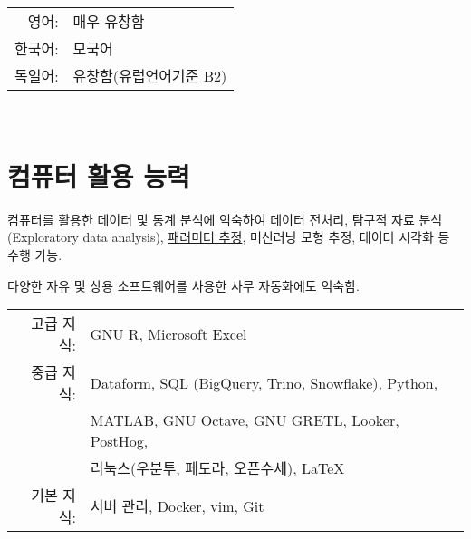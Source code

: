 \documentclass[a4paper]{article} %
\begin{document}
\begin{tabular}{rl}
\textsc{영어:} & 매우 유창함\\

\textsc{한국어:} & 모국어\\

\textsc{독일어:} & 유창함(유럽언어기준 B2)\\
\end{tabular}
\\
\section{컴퓨터 활용 능력}

컴퓨터를 활용한 데이터 및 통계 분석에 익숙하여
데이터 전처리, 탐구적 자료 분석(Exploratory data analysis),
\href{https://www.sciencedirect.com/topics/mathematics/classical-inference}{패러미터
추정}, 머신러닝 모형 추정, 데이터 시각화 등 수행 가능.

다양한 자유 및 상용 소프트웨어를 사용한 사무 자동화에도 익숙함.

\begin{tabular}{rl}
고급 지식: & GNU R, Microsoft Excel\\
중급 지식: & Dataform, SQL (BigQuery, Trino, Snowflake), Python, \\
&MATLAB, GNU Octave, GNU GRETL, Looker, PostHog, \\
&리눅스(우분투, 페도라, 오픈수세), \LaTeX\\
기본 지식: & 서버 관리, Docker, vim, Git\\
\end{tabular}

%
%	
%	
\end{document}
